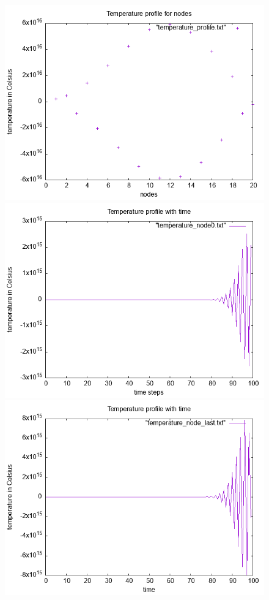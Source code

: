 \documentclass{article}
\begin{document}
\begin{figure}[ht]
\centering
\includegraphics[scale = 0.5]{temperature_profile_N_20_dt_100.png}
\includegraphics[scale =0.5]{temperature_node0_N_20_dt_100.png}
\includegraphics[scale =0.5]{temperature_node_last_N_20_dt_100.png}

\end{figure}
\end{document}
